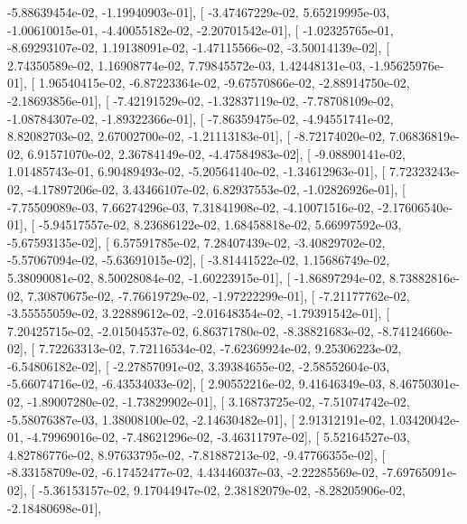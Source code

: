 \documentclass{article}
\begin{document}
         -5.88639454e-02,  -1.19940903e-01],
       [ -3.47467229e-02,   5.65219995e-03,  -1.00610015e-01,
         -4.40055182e-02,  -2.20701542e-01],
       [ -1.02325765e-01,  -8.69293107e-02,   1.19138091e-02,
         -1.47115566e-02,  -3.50014139e-02],
       [  2.74350589e-02,   1.16908774e-02,   7.79845572e-03,
          1.42448131e-03,  -1.95625976e-01],
       [  1.96540415e-02,  -6.87223364e-02,  -9.67570866e-02,
         -2.88914750e-02,  -2.18693856e-01],
       [ -7.42191529e-02,  -1.32837119e-02,  -7.78708109e-02,
         -1.08784307e-02,  -1.89322366e-01],
       [ -7.86359475e-02,  -4.94551741e-02,   8.82082703e-02,
          2.67002700e-02,  -1.21113183e-01],
       [ -8.72174020e-02,   7.06836819e-02,   6.91571070e-02,
          2.36784149e-02,  -4.47584983e-02],
       [ -9.08890141e-02,   1.01485743e-01,   6.90489493e-02,
         -5.20564140e-02,  -1.34612963e-01],
       [  7.72323243e-02,  -4.17897206e-02,   3.43466107e-02,
          6.82937553e-02,  -1.02826926e-01],
       [ -7.75509089e-03,   7.66274296e-03,   7.31841908e-02,
         -4.10071516e-02,  -2.17606540e-01],
       [ -5.94517557e-02,   8.23686122e-02,   1.68458818e-02,
          5.66997592e-03,  -5.67593135e-02],
       [  6.57591785e-02,   7.28407439e-02,  -3.40829702e-02,
         -5.57067094e-02,  -5.63691015e-02],
       [ -3.81441522e-02,   1.15686749e-02,   5.38090081e-02,
          8.50028084e-02,  -1.60223915e-01],
       [ -1.86897294e-02,   8.73882816e-02,   7.30870675e-02,
         -7.76619729e-02,  -1.97222299e-01],
       [ -7.21177762e-02,  -3.55555059e-02,   3.22889612e-02,
         -2.01648354e-02,  -1.79391542e-01],
       [  7.20425715e-02,  -2.01504537e-02,   6.86371780e-02,
         -8.38821683e-02,  -8.74124660e-02],
       [  7.72263313e-02,   7.72116534e-02,  -7.62369924e-02,
          9.25306223e-02,  -6.54806182e-02],
       [ -2.27857091e-02,   3.39384655e-02,  -2.58552604e-03,
         -5.66074716e-02,  -6.43534033e-02],
       [  2.90552216e-02,   9.41646349e-03,   8.46750301e-02,
         -1.89007280e-02,  -1.73829902e-01],
       [  3.16873725e-02,  -7.51074742e-02,  -5.58076387e-03,
          1.38008100e-02,  -2.14630482e-01],
       [  2.91312191e-02,   1.03420042e-01,  -4.79969016e-02,
         -7.48621296e-02,  -3.46311797e-02],
       [  5.52164527e-03,   4.82786776e-02,   8.97633795e-02,
         -7.81887213e-02,  -9.47766355e-02],
       [ -8.33158709e-02,  -6.17452477e-02,   4.43446037e-03,
         -2.22285569e-02,  -7.69765091e-02],
       [ -5.36153157e-02,   9.17044947e-02,   2.38182079e-02,
         -8.28205906e-02,  -2.18480698e-01],
\end{document}
